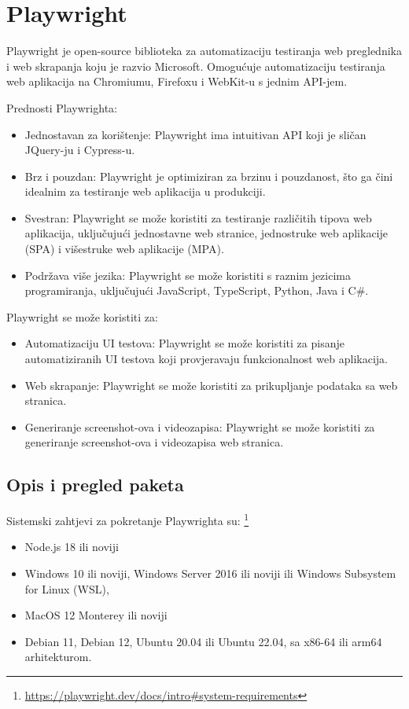 \chapter{Playwright}\label{ch_playwright}
Playwright je open-source biblioteka za automatizaciju testiranja web preglednika i web skrapanja koju je razvio Microsoft. Omogućuje automatizaciju testiranja web aplikacija na Chromiumu, Firefoxu i WebKit-u s jednim API-jem.

Prednosti Playwrighta:

\begin{itemize}

\item Jednostavan za korištenje: Playwright ima intuitivan API koji je sličan JQuery-ju i Cypress-u.
\item Brz i pouzdan: Playwright je optimiziran za brzinu i pouzdanost, što ga čini idealnim za testiranje web aplikacija u produkciji.
\item Svestran: Playwright se može koristiti za testiranje različitih tipova web aplikacija, uključujući jednostavne web stranice, jednostruke web aplikacije (SPA) i višestruke web aplikacije (MPA).
\item Podržava više jezika: Playwright se može koristiti s raznim jezicima programiranja, uključujući JavaScript, TypeScript, Python, Java i C\#.
\end{itemize}

Playwright se može koristiti za:
\begin{itemize}
\item Automatizaciju UI testova: Playwright se može koristiti za pisanje automatiziranih UI testova koji provjeravaju funkcionalnost web aplikacija.
\item Web skrapanje: Playwright se može koristiti za prikupljanje podataka sa web stranica.
\item Generiranje screenshot-ova i videozapisa: Playwright se može koristiti za generiranje screenshot-ova i videozapisa web stranica.
\end{itemize}
    
\section{Opis i pregled paketa}
Sistemski zahtjevi za pokretanje Playwrighta su: \footnote{\url{https://playwright.dev/docs/intro\#system-requirements}}
\begin{itemize}
    \item Node.js 18 ili noviji
    \item Windows 10 ili noviji, Windows Server 2016 ili noviji ili Windows Subsystem for Linux (WSL),
    \item MacOS 12 Monterey ili noviji
    \item Debian 11, Debian 12, Ubuntu 20.04 ili Ubuntu 22.04, sa x86-64 ili arm64 arhitekturom.
\end{itemize}

